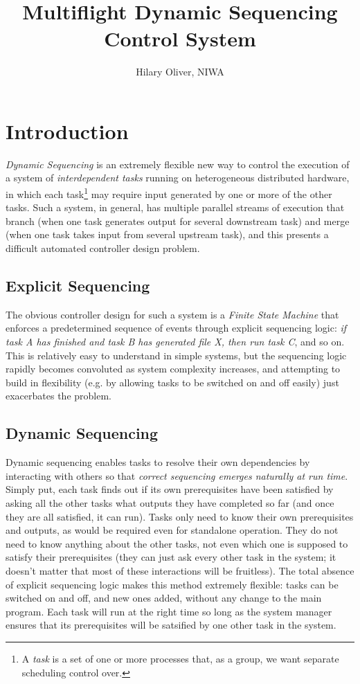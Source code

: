 \documentclass[11pt,a4paper]{report}
\title{Multiflight Dynamic Sequencing Control System}
\author{Hilary Oliver, NIWA}
\begin{document}
\maketitle
\tableofcontents


\chapter{Introduction}

{\em Dynamic Sequencing} is an extremely flexible new way to control the
execution of a system of {\em interdependent tasks} running on
heterogeneous distributed hardware, in which each task\footnote{A {\em
task} is a set of one or more processes that, as a group, we want
separate scheduling control over.} may require input generated by one or
more of the other tasks.  Such a system, in general, has multiple
parallel streams of execution that branch (when one task generates
output for several downstream task) and merge (when one task takes input
from several upstream task), and this presents a difficult automated
controller design problem.

\section{Explicit Sequencing}

The obvious controller design for such a system is a {\em Finite State
Machine} that enforces a predetermined sequence of events through
explicit sequencing logic: {\em if task A has finished and task B has
generated file X, then run task C}, and so on. This is relatively easy
to understand in simple systems, but the sequencing logic rapidly
becomes convoluted as system complexity increases, and attempting to
build in flexibility (e.g. by allowing tasks to be switched on and off
easily) just exacerbates the problem.

\section{Dynamic Sequencing}

Dynamic sequencing enables tasks to resolve their own dependencies by
interacting with others so that {\em correct sequencing emerges
naturally at run time}. Simply put, each task finds out if its own
prerequisites have been satisfied by asking all the other tasks what
outputs they have completed so far (and once they are all satisfied, it
can run).  Tasks only need to know their own prerequisites and outputs,
as would be required even for standalone operation. They do not need to
know anything about the other tasks, not even which one is supposed to
satisfy their prerequisites (they can just ask every other task in the
system; it doesn't matter that most of these interactions will be
fruitless).  The total absence of explicit sequencing logic makes this
method extremely flexible: tasks can be switched on and off, and new
ones added, without any change to the main program. Each task will run
at the right time so long as the system manager ensures that its
prerequisites will be satsified by one other task in the system.
\end{document}
